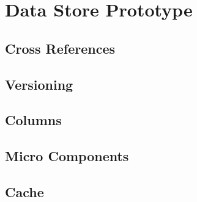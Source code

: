 \section{Data Store Prototype}
\glsresetall 

\subsection{Cross References}
\subsection{Versioning}
\subsection{Columns}
\subsection{Micro Components}
\subsection{Cache}

